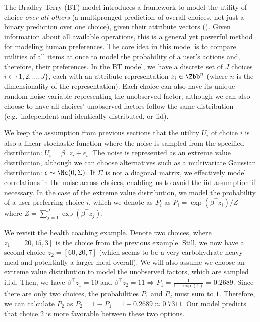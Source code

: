 \documentclass[
  letterpaper,
  DIV=11,
  numbers=noendperiod,
  oneside]{scrreprt}
\theoremstyle{remark}
\begin{document}
The Bradley-Terry (BT) model introduces a framework to model the utility
of choice \emph{over all others} (a multipronged prediction of overall
choices, not just a binary prediction over one choice), given their
attribute vectors (). Given information about all available operations, this is a
general yet powerful method for modeling human preferences. The core
idea in this model is to compare utilities of all items at once to model
the probability of a user's actions and, therefore, their preferences.
In the BT model, we have a discrete set of \(J\) choices
\(i \in \{1, 2, \dots, J\}\), each with an attribute representation
\(z_i \in \Zbb^n\) (where \(n\) is the dimensionality of the
representation). Each choice can also have its unique random noise
variable representing the unobserved factor, although we can also choose
to have all choices' unobserved factors follow the same distribution
(e.g.~independent and identically distributed, or iid).

We keep the assumption from previous sections that the utility \(U_i\)
of choice \(i\) is also a linear stochastic function where the noise is
sampled from the specified distribution:
\(U_i = \beta^\top z_i + \epsilon_i\). The noise is represented as an
extreme value distribution, although we can choose alternatives such as
a multivariate Gaussian distribution: \(\epsilon \sim \Nc(0, \Sigma)\).
If \(\Sigma\) is not a diagonal matrix, we effectively model
correlations in the noise across choices, enabling us to avoid the iid
assumption if necessary. In the case of the extreme value distribution,
we model the probability of a user preferring choice \(i\), which we
denote as \(P_i\) as \(P_i = \exp(\beta^\top z_i)/Z\) where
\(Z = \sum_{j = 1}^{J} \exp(\beta^\top z_j)\).

We revisit the health coaching example. Denote two choices, where
\(z_1 = [20, 15, 3]\) is the choice from the previous example. Still, we
now have a second choice \(z_2 = [60, 20, 7]\) (which seems to be a very
carbohydrate-heavy meal and potentially a larger meal overall). We will
also assume we choose an extreme value distribution to model the
unobserved factors, which are sampled i.i.d. Then, we have
\(\beta^\top z_1 = 10\) and
\(\beta^\top z_2 = 11 \Rightarrow P_1 = \frac{1}{1 + \exp(1)} = 0.2689\).
Since there are only two choices, the probabilities \(P_1\) and \(P_2\)
must sum to \(1\). Therefore, we can calculate \(P_2\) as
\(P_2 = 1 - P_1 = 1 - 0.2689 \approx 0.7311\). Our model predicts that
choice 2 is more favorable between these two options.
\end{document}
